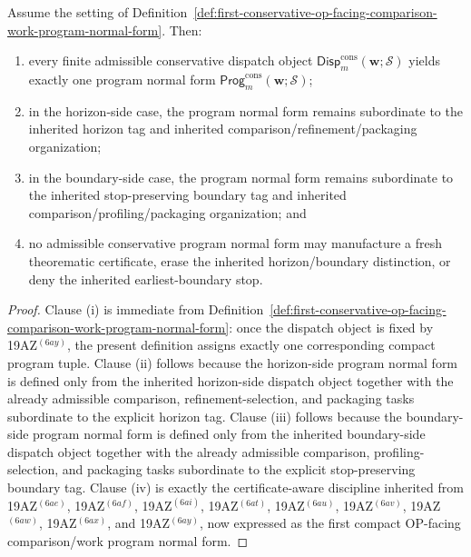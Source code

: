 \begin{proposition}
\label{prop:every-finite-admissible-conservative-dispatch-object-yields-exactly-one-conservative-comparison-work-program-normal-form}
Assume the setting of Definition~\ref{def:first-conservative-op-facing-comparison-work-program-normal-form}. Then:
\begin{enumerate}[label=(\roman*)]
 \item every finite admissible conservative dispatch object \(\mathsf{Disp}^{\mathrm{cons}}_{m}(\mathbf w;\mathcal S)\) yields exactly one program normal form \(\mathsf{Prog}^{\mathrm{cons}}_{m}(\mathbf w;\mathcal S)\);
 \item in the horizon-side case, the program normal form remains subordinate to the inherited horizon tag and inherited comparison/refinement/packaging organization;
 \item in the boundary-side case, the program normal form remains subordinate to the inherited stop-preserving boundary tag and inherited comparison/profiling/packaging organization; and
 \item no admissible conservative program normal form may manufacture a fresh theorematic certificate, erase the inherited horizon/boundary distinction, or deny the inherited earliest-boundary stop.
\end{enumerate}
\end{proposition}

\begin{proof}
Clause (i) is immediate from Definition~\ref{def:first-conservative-op-facing-comparison-work-program-normal-form}: once the dispatch object is fixed by 19AZ$^{(6ay)}$, the present definition assigns exactly one corresponding compact program tuple. Clause (ii) follows because the horizon-side program normal form is defined only from the inherited horizon-side dispatch object together with the already admissible comparison, refinement-selection, and packaging tasks subordinate to the explicit horizon tag. Clause (iii) follows because the boundary-side program normal form is defined only from the inherited boundary-side dispatch object together with the already admissible comparison, profiling-selection, and packaging tasks subordinate to the explicit stop-preserving boundary tag. Clause (iv) is exactly the certificate-aware discipline inherited from 19AZ$^{(6ae)}$, 19AZ$^{(6af)}$, 19AZ$^{(6ai)}$, 19AZ$^{(6at)}$, 19AZ$^{(6au)}$, 19AZ$^{(6av)}$, 19AZ$^{(6aw)}$, 19AZ$^{(6ax)}$, and 19AZ$^{(6ay)}$, now expressed as the first compact OP-facing comparison/work program normal form.
\end{proof}

